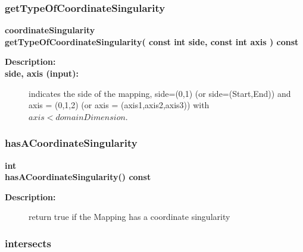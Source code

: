 \subsubsection{getTypeOfCoordinateSingularity}
 
\begin{flushleft} \textbf{%
coordinateSingularity  \\ 
\settowidth{\MappingIncludeArgIndent}{getTypeOfCoordinateSingularity(}%
getTypeOfCoordinateSingularity( const int side, const int axis  ) const
}\end{flushleft}
\begin{description}
\item[{\bf Description:}] 
\item[{\bf side, axis (input):}]  indicates the side of the mapping, side=(0,1) (or side=(Start,End)) 
     and axis = (0,1,2) (or axis = (axis1,axis2,axis3)) with $axis<domainDimension$.
\end{description}
\subsubsection{hasACoordinateSingularity}
 
\begin{flushleft} \textbf{%
int  \\ 
\settowidth{\MappingIncludeArgIndent}{hasACoordinateSingularity(}%
hasACoordinateSingularity() const
}\end{flushleft}
\begin{description}
\item[{\bf Description:}]  return true if the Mapping has a coordinate singularity
\end{description}
\subsubsection{intersects}
 
